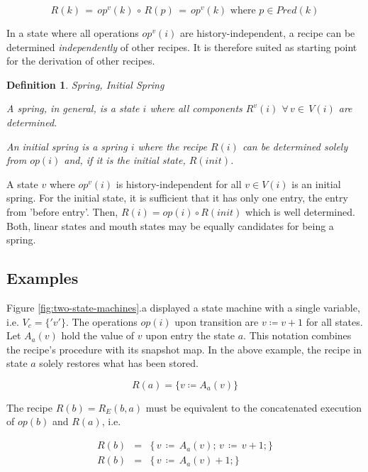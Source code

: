 \documentclass[12pt,a4paper]{scrartcl}
\newtheorem{definition}{Definition}
\begin{document}
\begin{equation}
    R(k)\,=\,op^v(k)\,\circ\,R(p)\,=\,op^v(k)\,\,\mbox{where $p\in Pred(k)$}
\end{equation}

In a state where all operations $op^v(i)$ are history-independent, a recipe can
be determined \textit{independently} of other recipes. It is therefore suited
as starting point for the derivation of other recipes.

\begin{definition} Spring, Initial Spring \label{def:springs}

    A spring, in general, is a state $i$ where all components $R^v(i)$
    $\forall\,v\in\,V(i)$ are determined.
    
    An initial spring is a spring $i$ where the recipe $R(i)$ can be determined
    solely from $op(i)$ and, if it is the initial state, $R(init)$. 

\end{definition}

A state $v$ where $op^v(i)$ is history-independent for all $v\in V(i)$ is an initial
spring. For the initial state, it is sufficient that it has only one entry, the
entry from 'before entry'. Then, $R(i) = op(i)\circ R(init)$ which is well
determined.  Both, linear states and mouth states may be equally candidates for
being a spring.

\subsection{Examples}
                 
Figure \ref{fig:two-state-machines}.a displayed a state machine with a single
variable, i.e. $V_c=\{'v'\}$. The operations $op(i)$ upon transition are
$v\coloneqq v+1$ for all states. Let $A_a(v)$ hold the value of $v$ upon entry the
state $a$.  This notation combines the recipe's procedure with its snapshot
map.  In the above example, the recipe in state $a$ solely restores what has
been stored.

\begin{equation} 
    R(a) = \{ v \coloneqq  A_a(v) \} 
\end{equation}

The recipe $R(b)=R_E(b,a)$ must be equivalent to the concatenated execution of
$op(b)$ and $R(a)$, i.e.

\begin{eqnarray}
    R(b)&=&\{\,v\,\coloneqq \,A_a(v);\,v\,\coloneqq \,v + 1;\} \\
    R(b)&=&\{\,v\,\coloneqq \,A_a(v) + 1; \}                                 
\end{eqnarray}
\end{document}
